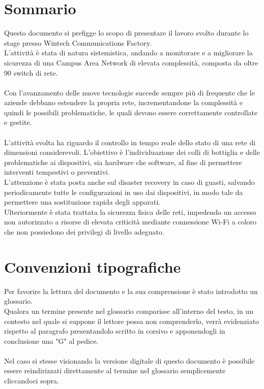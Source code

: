 \documentclass[Tesi.tex]{subfiles}
\begin{document}
\clearpage\thispagestyle{empty}
	
\renewcommand{\chaptername}{}
\renewcommand{\thechapter}{}
\chapter{Sommario}
Questo documento si prefigge lo scopo di presentare il lavoro svolto durante lo stage presso Wintech Communications Factory. \\
L'attività è stata di natura sistemistica, andando a monitorare e a migliorare la sicurezza di una Campus Area Network di elevata complessità, composta da oltre 90 switch di rete. \\\\

Con l'avanzamento delle nuove tecnologie succede sempre più di frequente che le aziende debbano estendere la propria rete, incrementandone la complessità e quindi le possibili problematiche, le quali devono essere correttamente controllate e gestite. \\\\
L'attività svolta ha riguardo il controllo in tempo reale dello stato di una rete di dimensioni considerevoli. L'obiettivo è l'individuazione dei colli di bottiglia e delle problematiche ai dispositivi, sia hardware che software, al fine di permettere interventi tempestivi o preventivi.\\
L'attenzione è stata posta anche sul disaster recovery in caso di guasti, salvando periodicamente tutte le configurazioni in uso dai dispositivi, in modo tale da permettere una sostituzione rapida degli apparati. \\
Ulteriormente è stata trattata la sicurezza fisica delle reti, impedendo un accesso non autorizzato a risorse di elevata criticità mediante connessione Wi-Fi a coloro che non possiedono dei privilegi di livello adeguato. \\


\newpage
\chapter{Convenzioni tipografiche}
Per favorire la lettura del documento e la sua comprensione è stato introdotto un glossario. \\
Qualora un termine presente nel glossario comparisse all'interno del testo, in un contesto nel quale si suppone il lettore possa non comprenderlo, verrà evidenziato rispetto al paragrafo presentandolo scritto in corsivo e apponendogli in conclusione una "G" al pedice. \\\\
Nel caso si stesse visionando la versione digitale di questo documento è possibile essere reindirizzati direttamente al termine nel glossario semplicemente cliccandoci sopra. \\


\clearpage
\end{document}
